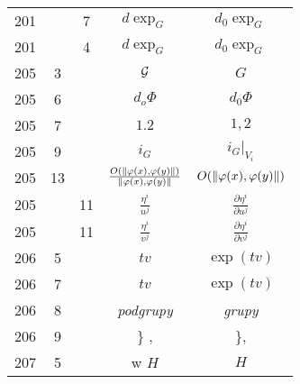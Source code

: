 \documentclass[a4paper,11pt]{article}
\begin{document}
\begin{center}
\begin{tabular}{|c|c|c|c|c|}
    201 & &  7 & $d \exp_{ G }$ & $d_{ 0 } \exp_{ G }$ \\
    201 & &  4 & $d \exp_{ G }$ & $d_{ 0 } \exp_{ G }$ \\
    205 &  3 & & $\mathcal{G}$ & $G$ \\
    205 &  6 & & $d_{ o }\Phi$ & $d_{ 0 }\Phi$ \\
    205 &  7 & & $1.2$ & $1, 2$ \\
    205 &  9 & & $i_{ G }$ & $i_{ G }|_{ V_{ i } }$ \\[0.2em]
    205 & 13 & & $\frac{ O( \lVert{  \varphi( x ), \varphi( y )  }\rVert ) }
                 { \lVert{  \varphi( x ), \varphi( y )  }\rVert }$
           & $O( \lVert{  \varphi( x ), \varphi( y )  }\rVert )$ \\[0.5em]
    205 & & 11 & $\frac{ \eta^{ i } }{ u^{ j } }$
           & $\frac{ \partial \eta^{ i } }{ \partial u^{ j } }$ \\[0.5em]
    205 & & 11 & $\frac{ \eta^{ i } }{ v^{ j } }$
           & $\frac{ \partial \eta^{ i } }{ \partial v^{ j } }$ \\[0.3em]
    206 &  5 & & $t v$ & $\exp( t v )$ \\
    206 &  7 & & $t v$ & $\exp( t v )$ \\
    206 &  8 & & \textit{podgrupy} & \textit{grupy} \\
    206 &  9 & & \} , & \}, \\
    207 &  5 & & w $H$ & $H$ \\
    \hline
  \end{tabular}






\end{center}
\end{document}
